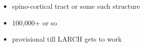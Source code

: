\begin{itemize}
  \item spino-cortical tract or some such structure
  \item 100,000+ or so
  \item provisional till \textsc{LARCH} gets to work
\end{itemize}
